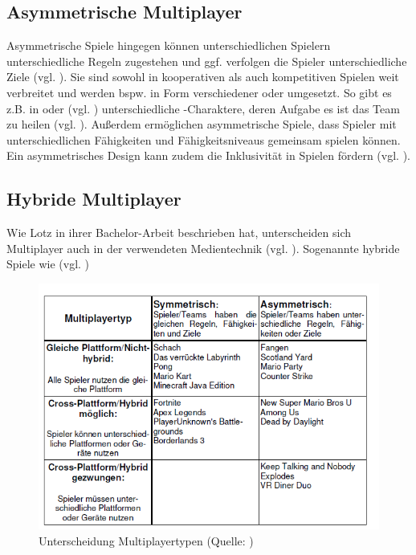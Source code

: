 \subsection{Asymmetrische Multiplayer}
Asymmetrische Spiele hingegen können unterschiedlichen Spielern unterschiedliche Regeln zugestehen und ggf. verfolgen die Spieler unterschiedliche Ziele (vgl. \citealp[S. 12]{adams_fundamentals_2013}). Sie sind sowohl in kooperativen als auch kompetitiven Spielen weit verbreitet und werden bspw. in Form verschiedener  oder  umgesetzt. So gibt es z.B. in  oder  (vgl. \citealp{noauthor_league_2025, noauthor_overwatch_nodate}) unterschiedliche -Charaktere, deren Aufgabe es ist das Team zu heilen (vgl. \citealp[S. 307f]{smilovitch_birdquestvr_2019}).
Außerdem ermöglichen asymmetrische Spiele, dass Spieler mit unterschiedlichen Fähigkeiten und Fähigkeitsniveaus gemeinsam spielen können. Ein asymmetrisches Design kann zudem die Inklusivität in Spielen fördern (vgl. \citealp[S. 308]{smilovitch_birdquestvr_2019}).

\subsection{Hybride Multiplayer}\label{sec:hybrid-multiplayer}
Wie Lotz in ihrer Bachelor-Arbeit beschrieben hat, unterscheiden sich Multiplayer auch in der verwendeten Medientechnik (vgl. \citealp[S. 6f]{lotz_konzeption_2021}). Sogenannte hybride Spiele wie  (vgl. \citealp{nintendo_mario_2012})

\begin{figure}[ht]
\centering
\includegraphics[width=1\linewidth]{content/pictures/lotz_hybrid_multiplayer.PNG}
\caption{Unterscheidung Multiplayertypen (Quelle: \citealp[S.6]{lotz_konzeption_2021})}
\label{fig:lotz_multiplayer_types}
\end{figure}

